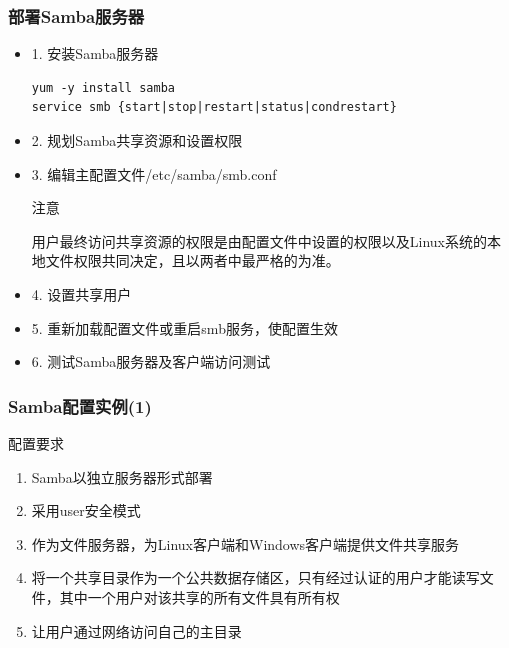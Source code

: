 \documentclass[xcolor=svgnames,presentation]{beamer}
\begin{document}
\begin{frame}[fragile]
\frametitle{部署Samba服务器}
\label{sec-2-5}
\begin{itemize}

\item 1. 安装Samba服务器\\
\label{sec-2-5-1}%
\begin{verbatim}
yum -y install samba
service smb {start|stop|restart|status|condrestart}
\end{verbatim}

\item 2. 规划Samba共享资源和设置权限
\label{sec-2-5-2}%

\item 3. 编辑主配置文件/etc/samba/smb.conf
\label{sec-2-5-3}%
\begin{block}{注意}
\label{sec-2-5-3-1}

用户最终访问共享资源的权限是由配置文件中设置的权限以及Linux系统的本地文件权限共同决定，且以两者中最严格的为准。
\end{block}

\item 4. 设置共享用户
\label{sec-2-5-4}%

\item 5. 重新加载配置文件或重启smb服务，使配置生效
\label{sec-2-5-5}%

\item 6. 测试Samba服务器及客户端访问测试
\label{sec-2-5-6}%
\end{itemize} %
\end{frame}
\begin{frame}
\frametitle{Samba配置实例(1)}
\label{sec-2-6}
\begin{exampleblock}{配置要求}
\label{sec-2-6-1}

\begin{enumerate}
\item Samba以独立服务器形式部署
\item 采用user安全模式
\item 作为文件服务器，为Linux客户端和Windows客户端提供文件共享服务
\item 将一个共享目录作为一个公共数据存储区，只有经过认证的用户才能读写文件，其中一个用户对该共享的所有文件具有所有权
\item 让用户通过网络访问自己的主目录
\end{enumerate}
\end{exampleblock}
\end{frame}
\end{document}

